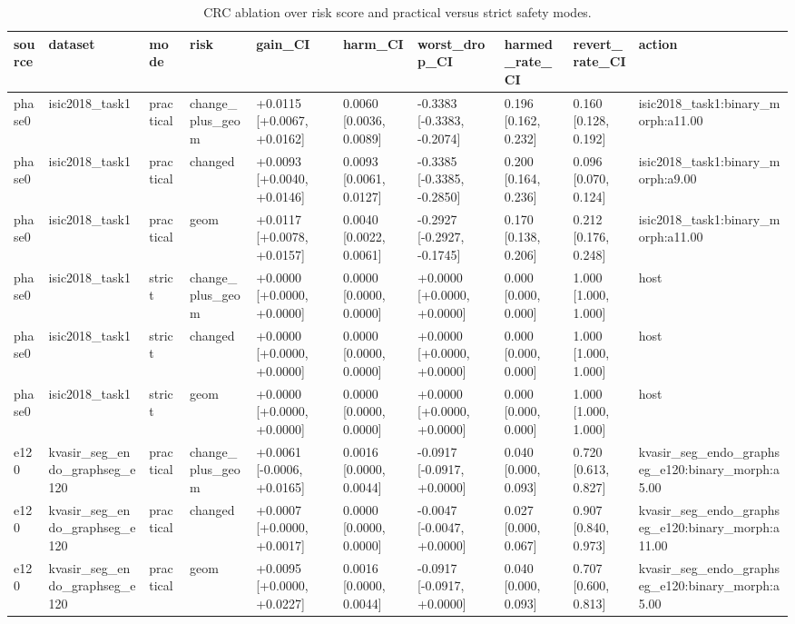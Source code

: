 \begin{table}[t]
\centering
\small
\caption{CRC ablation over risk score and practical versus strict safety modes.}
\label{tab:risk_ablation_crc}
\begin{tabular}{llllllllll}
\toprule
source & dataset & mode & risk & gain\_CI & harm\_CI & worst\_drop\_CI & harmed\_rate\_CI & revert\_rate\_CI & action \\
\midrule
phase0 & isic2018\_task1 & practical & change\_plus\_geom & +0.0115 [+0.0067, +0.0162] & 0.0060 [0.0036, 0.0089] & -0.3383 [-0.3383, -0.2074] & 0.196 [0.162, 0.232] & 0.160 [0.128, 0.192] & isic2018\_task1:binary\_morph:a11.00 \\
phase0 & isic2018\_task1 & practical & changed & +0.0093 [+0.0040, +0.0146] & 0.0093 [0.0061, 0.0127] & -0.3385 [-0.3385, -0.2850] & 0.200 [0.164, 0.236] & 0.096 [0.070, 0.124] & isic2018\_task1:binary\_morph:a9.00 \\
phase0 & isic2018\_task1 & practical & geom & +0.0117 [+0.0078, +0.0157] & 0.0040 [0.0022, 0.0061] & -0.2927 [-0.2927, -0.1745] & 0.170 [0.138, 0.206] & 0.212 [0.176, 0.248] & isic2018\_task1:binary\_morph:a11.00 \\
phase0 & isic2018\_task1 & strict & change\_plus\_geom & +0.0000 [+0.0000, +0.0000] & 0.0000 [0.0000, 0.0000] & +0.0000 [+0.0000, +0.0000] & 0.000 [0.000, 0.000] & 1.000 [1.000, 1.000] & host \\
phase0 & isic2018\_task1 & strict & changed & +0.0000 [+0.0000, +0.0000] & 0.0000 [0.0000, 0.0000] & +0.0000 [+0.0000, +0.0000] & 0.000 [0.000, 0.000] & 1.000 [1.000, 1.000] & host \\
phase0 & isic2018\_task1 & strict & geom & +0.0000 [+0.0000, +0.0000] & 0.0000 [0.0000, 0.0000] & +0.0000 [+0.0000, +0.0000] & 0.000 [0.000, 0.000] & 1.000 [1.000, 1.000] & host \\
e120 & kvasir\_seg\_endo\_graphseg\_e120 & practical & change\_plus\_geom & +0.0061 [-0.0006, +0.0165] & 0.0016 [0.0000, 0.0044] & -0.0917 [-0.0917, +0.0000] & 0.040 [0.000, 0.093] & 0.720 [0.613, 0.827] & kvasir\_seg\_endo\_graphseg\_e120:binary\_morph:a5.00 \\
e120 & kvasir\_seg\_endo\_graphseg\_e120 & practical & changed & +0.0007 [+0.0000, +0.0017] & 0.0000 [0.0000, 0.0000] & -0.0047 [-0.0047, +0.0000] & 0.027 [0.000, 0.067] & 0.907 [0.840, 0.973] & kvasir\_seg\_endo\_graphseg\_e120:binary\_morph:a11.00 \\
e120 & kvasir\_seg\_endo\_graphseg\_e120 & practical & geom & +0.0095 [+0.0000, +0.0227] & 0.0016 [0.0000, 0.0044] & -0.0917 [-0.0917, +0.0000] & 0.040 [0.000, 0.093] & 0.707 [0.600, 0.813] & kvasir\_seg\_endo\_graphseg\_e120:binary\_morph:a5.00 \\

\end{tabular}
\end{table}
